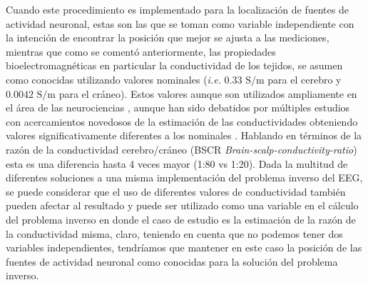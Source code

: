 Cuando este procedimiento es implementado para la localización de fuentes de actividad neuronal, estas son las que se toman como variable independiente con la intención de encontrar la posición que mejor se ajusta a las mediciones, mientras que como se comentó anteriormente, las propiedades bioelectromagnéticas en particular la conductividad de los tejidos, se asumen como conocidas utilizando valores nominales (\emph{i.e.} $0.33\text{ S/m}$ para el cerebro y $0.0042 \text{ S/m}$ para el cráneo).
Estos valores aunque son utilizados ampliamente en el área de las neurociencias \cite{Rush1968,Rush1969,Cohen1983}, aunque han sido debatidos por múltiples estudios con acercamientos novedosos de la estimación de las conductividades obteniendo valores significativamente diferentes a los nominales \cite{McCann2019}.
Hablando en términos de la razón de la conductividad cerebro/cráneo (BSCR \emph{Brain-scalp-conductivity-ratio}) esta es una diferencia hasta 4 veces mayor (1:80 vs 1:20).
Dada la multitud de diferentes soluciones a una misma implementación del problema inverso del EEG, se puede considerar que el uso de diferentes valores de conductividad también pueden afectar al resultado y puede ser utilizado como una variable en el cálculo del problema inverso en donde el caso de estudio es la estimación de la razón de la conductividad misma, claro, teniendo en cuenta que no podemos tener dos variables independientes, tendríamos que mantener en este caso la posición de las fuentes de actividad neuronal como conocidas para la solución del problema inverso.